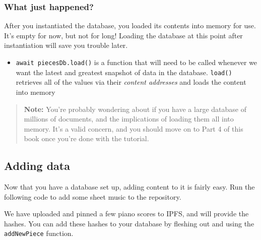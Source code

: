 \begin{Shaded}
\begin{Highlighting}[]
\NormalTok{() }\OperatorTok{\{} \OperatorTok{\}}
\NormalTok{() }\OperatorTok{\{} \OperatorTok{\}}
  \NormalTok{() }\OperatorTok{\{\}}
  \NormalTok{() }\OperatorTok{\{} \OperatorTok{\}}
  \NormalTok{() }\OperatorTok{\{} \OperatorTok{\}}
\NormalTok{()}
\OperatorTok{\}}
\end{Highlighting}
\end{Shaded}

\subsubsection{What just happened?}\label{what-just-happened-5}

After you instantiated the database, you loaded its contents into memory
for use. It's empty for now, but not for long! Loading the database at
this point after instantiation will save you trouble later.

\begin{itemize}
\tightlist
\item
  \texttt{await\ piecesDb.load()} is a function that will need to be
  called whenever we want the latest and greatest snapshot of data in
  the database. \texttt{load()} retrieves all of the values via their
  \emph{content addresses} and loads the content into memory
\end{itemize}

\begin{quote}
\textbf{Note:} You're probably wondering about if you have a large
database of millions of documents, and the implications of loading them
all into memory. It's a valid concern, and you should move on to Part 4
of this book once you're done with the tutorial.
\end{quote}

\hypertarget{adding-data}{\subsection{Adding data}\label{adding-data}}

Now that you have a database set up, adding content to it is fairly
easy. Run the following code to add some sheet music to the repository.

We have uploaded and pinned a few piano scores to IPFS, and will provide
the hashes. You can add these hashes to your database by fleshing out
and using the \texttt{addNewPiece} function.

